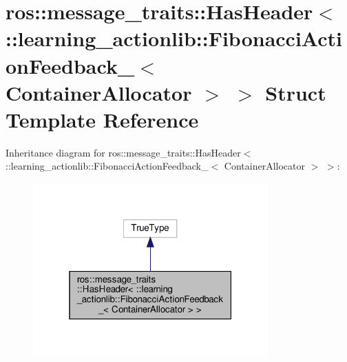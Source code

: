 \hypertarget{structros_1_1message__traits_1_1HasHeader_3_01_1_1learning__actionlib_1_1FibonacciActionFeedbacke0aeb31c094ffb671b10bcbd39f57eea}{}\section{ros\+:\+:message\+\_\+traits\+:\+:Has\+Header$<$ \+:\+:learning\+\_\+actionlib\+:\+:Fibonacci\+Action\+Feedback\+\_\+$<$ Container\+Allocator $>$ $>$ Struct Template Reference}
\label{structros_1_1message__traits_1_1HasHeader_3_01_1_1learning__actionlib_1_1FibonacciActionFeedbacke0aeb31c094ffb671b10bcbd39f57eea}


Inheritance diagram for ros\+:\+:message\+\_\+traits\+:\+:Has\+Header$<$ \+:\+:learning\+\_\+actionlib\+:\+:Fibonacci\+Action\+Feedback\+\_\+$<$ Container\+Allocator $>$ $>$\+:
\nopagebreak
\begin{figure}[H]
\begin{center}
\leavevmode
\includegraphics[width=256pt]{structros_1_1message__traits_1_1HasHeader_3_01_1_1learning__actionlib_1_1FibonacciActionFeedbacka983f8944c2a55358fc41a6d12725f44}
\end{center}
\end{figure}


